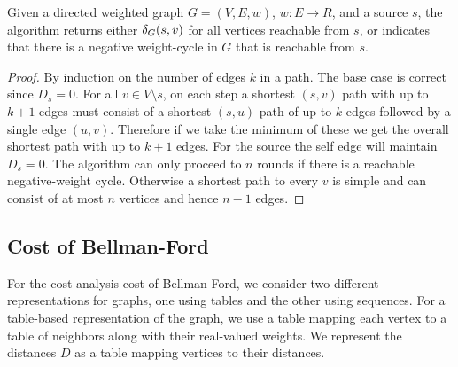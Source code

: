 \begin{theorem}
  Given a directed weighted graph $G = (V,E,w)$, $w : E \to R$, and a
  source $s$, the  algorithm returns either
  $\delta_G(s,v)$ for all vertices reachable from $s$, or indicates
  that there is a negative weight-cycle in $G$ that is reachable from
  $s$.
\end{theorem}
\begin{proof}
  By induction on the number of edges $k$ in a path.  The base case is
  correct since $D_s = 0$.  For all $v \in V\setminus{s}$, on each
  step a shortest $(s,v)$ path with up to $k+1$ edges must consist of
  a shortest $(s,u)$ path of up to $k$ edges followed by a single edge
  $(u,v)$.  Therefore if we take the minimum of these we get the
  overall shortest path with up to $k+1$ edges.  For the source the
  self edge will maintain $D_s = 0$.    The algorithm can only proceed
  to $n$ rounds if there is a reachable negative-weight cycle.   
  Otherwise a shortest path to every $v$ is simple and can consist of
  at most $n$ vertices and hence $n-1$ edges.
\end{proof}  

\subsection{Cost of Bellman-Ford}

For the cost analysis cost of Bellman-Ford, we consider two different
representations for graphs, one using tables and the other using
sequences.
%
For a table-based representation of the graph, we use a table mapping
each vertex to a table of neighbors along with their real-valued
weights.
%
We represent the distances $D$ as a table mapping vertices to their
distances.
%


